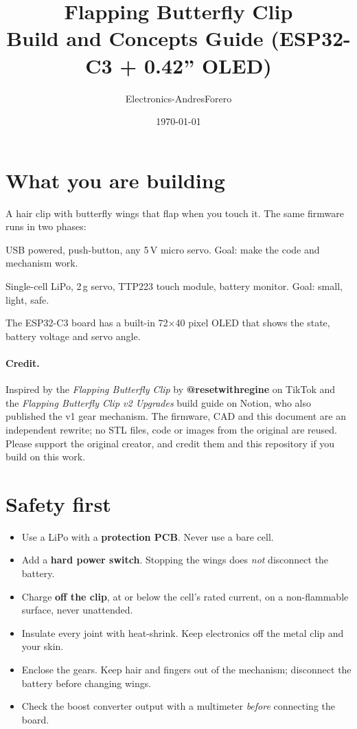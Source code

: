 \documentclass[11pt,a4paper]{article}
\title{Flapping Butterfly Clip\\\large Build and Concepts Guide (ESP32-C3 + 0.42'' OLED)}
\author{Electronics-AndresForero}
\date{\today}
\begin{document}
\maketitle
\tableofcontents

\section{What you are building}
A hair clip with butterfly wings that flap when you touch it. The same firmware runs in two phases:
\begin{description}[leftmargin=2.2cm,style=nextline]
  \item[Phase 1, bench] USB powered, push-button, any 5\,V micro servo. Goal: make the code and mechanism work.
  \item[Phase 2, wearable] Single-cell LiPo, 2\,g servo, TTP223 touch module, battery monitor. Goal: small, light, safe.
\end{description}
The ESP32-C3 board has a built-in 72$\times$40 pixel OLED that shows the state, battery voltage and servo angle.

\paragraph{Credit.} Inspired by the \emph{Flapping Butterfly Clip} by \textbf{@resetwithregine} on TikTok
and the \emph{Flapping Butterfly Clip v2 Upgrades} build guide on Notion, who also published the v1 gear
mechanism. The firmware, CAD and this document are an independent rewrite; no STL files, code or images from
the original are reused. Please support the original creator, and credit them and this repository if you build on this work.

\section{Safety first}
\begin{itemize}
  \item Use a LiPo with a \textbf{protection PCB}. Never use a bare cell.
  \item Add a \textbf{hard power switch}. Stopping the wings does \emph{not} disconnect the battery.
  \item Charge \textbf{off the clip}, at or below the cell's rated current, on a non-flammable surface, never unattended.
  \item Insulate every joint with heat-shrink. Keep electronics off the metal clip and your skin.
  \item Enclose the gears. Keep hair and fingers out of the mechanism; disconnect the battery before changing wings.
  \item Check the boost converter output with a multimeter \emph{before} connecting the board.
\end{itemize}
\end{document}
